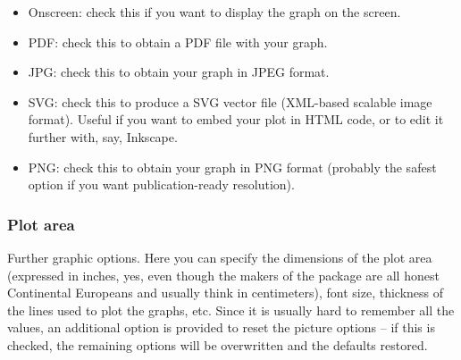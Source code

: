 \documentclass[11pt,a4paper]{article}
\def\margin#1{\marginpar{\textcolor{blue}{\footnotesize\tt #1}}}
\begin{document}
\begin{itemize}
\item Onscreen: check this if you want to display the graph on the screen.\margin{display.on.screen=}\margin{TRUE|FALSE} 

\item PDF: check this to obtain a PDF file with your graph.\margin{write.pdf.file=}\margin{TRUE|FALSE} 

\item JPG: check this to obtain your graph in JPEG format.\margin{write.jpg.file=}\margin{TRUE|FALSE} 

\item SVG: check this to produce a SVG vector file (XML-based scalable image
format). Useful if you want to embed your plot in HTML code, or to
edit it further with, say, Inkscape.\margin{write.svg.file=}\margin{TRUE|FALSE} 

\item PNG: check this to obtain your graph in PNG format (probably the safest
option if you want publication-ready resolution).\margin{write.png.file=}\margin{TRUE|FALSE} 
\end{itemize}

\subsubsection{Plot area}

Further graphic options. Here you can specify the dimensions of the
plot area (expressed in inches, yes, even though the makers of the
package are all honest Continental Europeans and usually think in
centimeters), font size, thickness of the lines used to plot the graphs,
etc. Since it is usually hard to remember all the values, an additional
option is provided to reset the picture options -- if this is checked,
the remaining options will be overwritten and the defaults restored.
\end{document}
